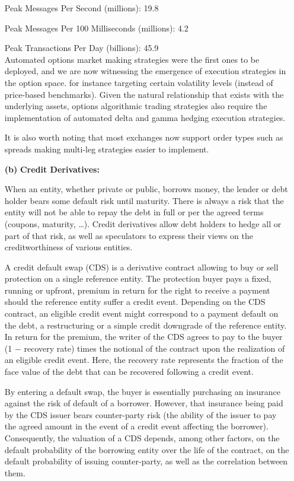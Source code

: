 \begin{enumerate}
Peak Messages Per Second (millions): 19.8

Peak Messages Per 100 Milliseconds (millions): 4.2

Peak Transactions Per Day (billions): 45.9 \\

Automated options market making strategies were the first ones to be deployed, and we are now witnessing the emergence of execution strategies in the option space. for instance targeting certain volatility levels (instead of price-based benchmarks). Given the natural relationship that exists with the underlying assets, options algorithmic trading strategies also require the implementation of automated delta and gamma hedging execution strategies.


It is also worth noting that most exchanges now support order types such as spreads making multi-leg strategies easier to implement.


\item[\textbf{(b)}] \textbf{Credit Derivatives:} 

When an entity, whether private or public, borrows money, the lender or debt holder bears some default risk until maturity. There is always a risk that the entity will not be able to repay the debt in full or per the agreed terms (coupons, maturity, \dots). Credit derivatives allow debt holders to hedge all or part of that risk, as well as speculators to express their views on the creditworthiness of various entities. 


A credit default swap (CDS) is a derivative contract allowing to buy or sell protection on a single reference entity. The protection buyer pays a fixed, running or upfront, premium in return for the right to receive a payment should the reference entity suffer a credit event. Depending on the CDS contract, an eligible credit event might correspond to a payment default on the debt, a restructuring or a simple credit downgrade of the reference entity. In return for the premium, the writer of the CDS agrees to pay to the buyer (1 $-$ recovery rate) times the notional of the contract upon the realization of an eligible credit event. Here, the recovery rate represents the fraction of the face value of the debt that can be recovered following a credit event.


By entering a default swap, the buyer is essentially purchasing an insurance against the risk of default of a borrower. However, that insurance being paid by the CDS issuer bears counter-party risk (the ability of the issuer to pay the agreed amount in the event of a credit event affecting the borrower). Consequently, the valuation of a CDS depends, among other factors, on the default probability of the borrowing entity over the life of the contract, on the default probability of issuing counter-party, as well as the correlation between them.



\end{enumerate}
